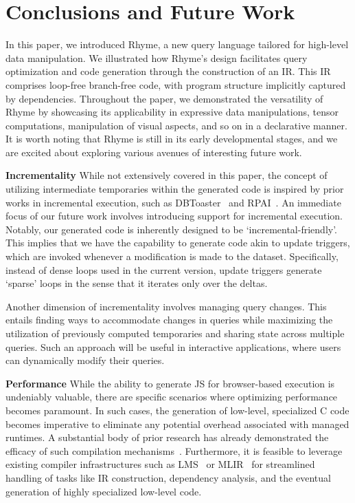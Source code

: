 \documentclass[runningheads]{llncs}
\newcommand{\lang}{Rhyme}
\begin{document}



\section{Conclusions and Future Work}\label{sec:conclusions}
In this paper, we introduced \lang{}, a new query language tailored for high-level
data manipulation.
We illustrated how \lang{}'s design facilitates query optimization and code generation
through the construction of an IR.
This IR comprises loop-free branch-free code, with program structure implicitly captured
by dependencies.
Throughout the paper, we demonstrated the versatility of \lang{} by showcasing its
applicability in expressive data manipulations,
tensor computations, manipulation of visual aspects, and so on in a declarative manner.
It is worth noting that \lang{} is still in its early developmental stages,
and we are excited about exploring various avenues of interesting future work.

\textbf{Incrementality}
While not extensively covered in this paper, the concept of utilizing
intermediate temporaries within the generated code is inspired by prior
works in incremental execution, such as DBToaster~\cite{dbtoaster_vldb}
and RPAI~\cite{rpai}.
An immediate focus of our future work involves introducing support for
incremental execution.
Notably, our generated code is inherently designed to be `incremental-friendly'.
This implies that we have the capability to generate code akin to update
triggers, which are invoked whenever a modification is made to the dataset.
Specifically, instead of dense loops used in the current version, update triggers
generate `sparse' loops in the sense that it iterates only over the deltas.

Another dimension of incrementality involves managing query changes.
This entails finding ways to accommodate changes in queries while maximizing
the utilization of previously computed temporaries and sharing state across
multiple queries. 
Such an approach will be useful in interactive applications, where users
can dynamically modify their queries.

\textbf{Performance}
While the ability to generate JS for browser-based execution is undeniably valuable,
there are specific scenarios where optimizing performance becomes paramount.
In such cases, the generation of low-level, specialized C code becomes imperative to
eliminate any potential overhead associated with managed runtimes.
A substantial body of prior research has already demonstrated the efficacy of
such compilation mechanisms~\cite{500lines,lb2,flare_osdi,sai_guannan}.
Furthermore, it is feasible to leverage existing compiler infrastructures such
as LMS~\cite{lms} or MLIR~\cite{mlir} for streamlined handling of tasks like
IR construction, dependency analysis, and the eventual generation of highly
specialized low-level code.
\end{document}
